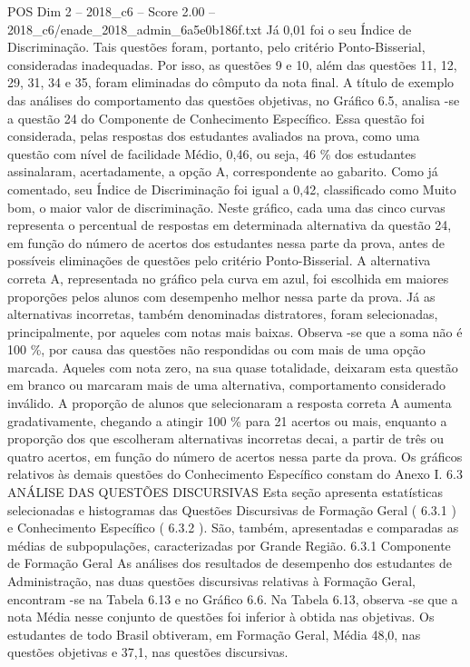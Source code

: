 \begin{textsample}{POS Dim 2 – 2018\_c6 – Score 2.00 – 2018\_c6/enade\_2018\_admin\_6a5e0b186f.txt}
Já 0,01 foi o seu Índice de Discriminação.
Tais questões foram, portanto, pelo critério Ponto-Bisserial, consideradas inadequadas.
Por isso, as questões 9 e 10, além das questões 11, 12, 29, 31, 34 e 35, foram eliminadas do cômputo da nota final.
A título de exemplo das análises do comportamento das questões objetivas, no Gráfico 6.5, analisa -se a questão 24 do Componente de Conhecimento Específico.
Essa questão foi considerada, pelas respostas dos estudantes avaliados na prova, como uma questão com nível de facilidade Médio, 0,46, ou seja, 46 \% dos estudantes assinalaram, acertadamente, a opção A, correspondente ao gabarito.
Como já comentado, seu Índice de Discriminação foi igual a 0,42, classificado como Muito bom, o maior valor de discriminação.
Neste gráfico, cada uma das cinco curvas representa o percentual de respostas em determinada alternativa da questão 24, em função do número de acertos dos estudantes nessa parte da prova, antes de possíveis eliminações de questões pelo critério Ponto-Bisserial.
A alternativa correta A, representada no gráfico pela curva em azul, foi escolhida em maiores proporções pelos alunos com desempenho melhor nessa parte da prova.
Já as alternativas incorretas, também denominadas distratores, foram selecionadas, principalmente, por aqueles com notas mais baixas.
Observa -se que a soma não é 100 \%, por causa das questões não respondidas ou com mais de uma opção marcada.
Aqueles com nota zero, na sua quase totalidade, deixaram esta questão em branco ou marcaram mais de uma alternativa, comportamento considerado inválido.
A proporção de alunos que selecionaram a resposta correta A aumenta gradativamente, chegando a atingir 100 \% para 21 acertos ou mais, enquanto a proporção dos que escolheram alternativas incorretas decai, a partir de três ou quatro acertos, em função do número de acertos nessa parte da prova.
Os gráficos relativos às demais questões do Conhecimento Específico constam do Anexo I. 6.3 ANÁLISE DAS QUESTÕES DISCURSIVAS Esta seção apresenta estatísticas selecionadas e histogramas das Questões Discursivas de Formação Geral ( 6.3.1 ) e Conhecimento Específico ( 6.3.2 ).
São, também, apresentadas e comparadas as médias de subpopulações, caracterizadas por Grande Região. 6.3.1 Componente de Formação Geral As análises dos resultados de desempenho dos estudantes de Administração, nas duas questões discursivas relativas à Formação Geral, encontram -se na Tabela 6.13 e no Gráfico 6.6.
Na Tabela 6.13, observa -se que a nota Média nesse conjunto de questões foi inferior à obtida nas objetivas.
Os estudantes de todo Brasil obtiveram, em Formação Geral, Média 48,0, nas questões objetivas e 37,1, nas questões discursivas.

\end{textsample}
